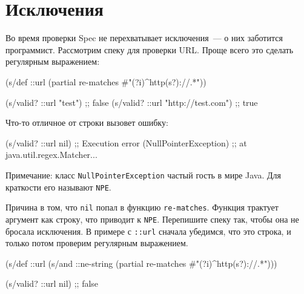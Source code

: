 \section{Исключения}


Во время проверки Spec не перехватывает исключения~--- о них заботится
программист. Рассмотрим спеку для проверки URL. Проще всего это сделать
регулярным выражением:


\begin{english}
  \begin{clojure}
(s/def ::url
  (partial re-matches #"(?i)^http(s?)://.*"))

(s/valid? ::url "test")            ;; false
(s/valid? ::url "http://test.com") ;; true
  \end{clojure}
\end{english}

\noindent
Что-то отличное от строки вызовет ошибку:


\begin{english}
  \begin{clojure}
(s/valid? ::url nil)
;; Execution error (NullPointerException)
;; at java.util.regex.Matcher...
  \end{clojure}
\end{english}


Примечание: класс \verb|NullPointerException| частый гость в мире Java. Для
краткости его называют \verb|NPE|.

Причина в том, что \verb|nil| попал в функцию \verb|re-matches|. Функция
трактует аргумент как строку, что приводит к \verb|NPE|. Перепишите спеку так,
чтобы она не бросала исключения. В примере с \verb|::url| сначала убедимся,
что это строка, и только потом проверим регулярным выражением.

\begin{english}
  \begin{clojure}
(s/def ::url
  (s/and ::ne-string
         (partial re-matches #"(?i)^http(s?)://.*")))

(s/valid? ::url nil) ;; false
  \end{clojure}
\end{english}


